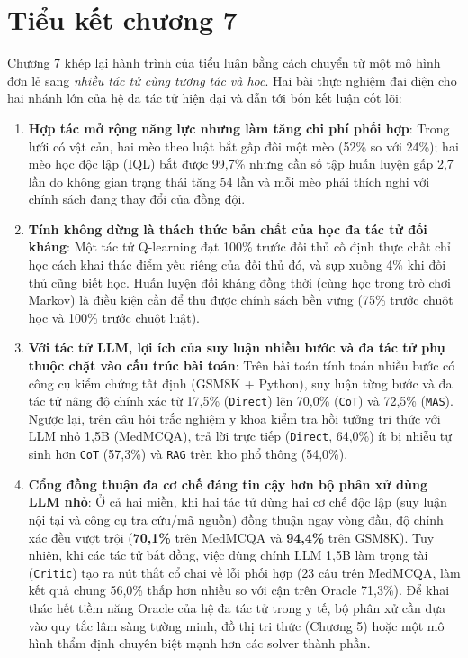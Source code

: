 

\section{Tiểu kết chương 7}

Chương 7 khép lại hành trình của tiểu luận bằng cách chuyển từ một mô hình đơn lẻ sang \emph{nhiều tác tử cùng tương tác và học}. Hai bài thực nghiệm đại diện cho hai nhánh lớn của hệ đa tác tử hiện đại và dẫn tới bốn kết luận cốt lõi:
\begin{enumerate}
  \item \textbf{Hợp tác mở rộng năng lực nhưng làm tăng chi phí phối hợp}: Trong lưới có vật cản, hai mèo theo luật bắt gấp đôi một mèo (52\% so với 24\%); hai mèo học độc lập (IQL) bắt được 99,7\% nhưng cần số tập huấn luyện gấp 2,7 lần do không gian trạng thái tăng 54 lần và mỗi mèo phải thích nghi với chính sách đang thay đổi của đồng đội.
  \item \textbf{Tính không dừng là thách thức bản chất của học đa tác tử đối kháng}: Một tác tử Q-learning đạt 100\% trước đối thủ cố định thực chất chỉ học cách khai thác điểm yếu riêng của đối thủ đó, và sụp xuống 4\% khi đối thủ cũng biết học. Huấn luyện đối kháng đồng thời (cùng học trong trò chơi Markov) là điều kiện cần để thu được chính sách bền vững (75\% trước chuột học và 100\% trước chuột luật).
  \item \textbf{Với tác tử LLM, lợi ích của suy luận nhiều bước và đa tác tử phụ thuộc chặt vào cấu trúc bài toán}: Trên bài toán tính toán nhiều bước có công cụ kiểm chứng tất định (GSM8K + Python), suy luận từng bước và đa tác tử nâng độ chính xác từ 17,5\% (\texttt{Direct}) lên 70,0\% (\texttt{CoT}) và 72,5\% (\texttt{MAS}). Ngược lại, trên câu hỏi trắc nghiệm y khoa kiểm tra hồi tưởng tri thức với LLM nhỏ 1,5B (MedMCQA), trả lời trực tiếp (\texttt{Direct}, 64,0\%) ít bị nhiễu tự sinh hơn \texttt{CoT} (57,3\%) và \texttt{RAG} trên kho phổ thông (54,0\%).
  \item \textbf{Cổng đồng thuận đa cơ chế đáng tin cậy hơn bộ phân xử dùng LLM nhỏ}: Ở cả hai miền, khi hai tác tử dùng hai cơ chế độc lập (suy luận nội tại và công cụ tra cứu/mã nguồn) đồng thuận ngay vòng đầu, độ chính xác đều vượt trội (\textbf{70,1\%} trên MedMCQA và \textbf{94,4\%} trên GSM8K). Tuy nhiên, khi các tác tử bất đồng, việc dùng chính LLM 1,5B làm trọng tài (\texttt{Critic}) tạo ra nút thắt cổ chai về lỗi phối hợp (23 câu trên MedMCQA, làm kết quả chung 56,0\% thấp hơn nhiều so với cận trên Oracle 71,3\%). Để khai thác hết tiềm năng Oracle của hệ đa tác tử trong y tế, bộ phân xử cần dựa vào quy tắc lâm sàng tường minh, đồ thị tri thức (Chương 5) hoặc một mô hình thẩm định chuyên biệt mạnh hơn các solver thành phần.
\end{enumerate}

